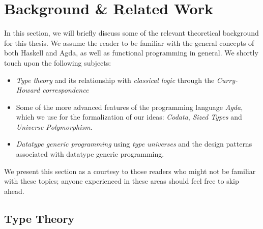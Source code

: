 \documentclass[a4paper,msc,twosized=semi]{uustthesis}
\begin{document}




\chapter{Background \& Related Work}
In this section, we will briefly discuss some of the relevant theoretical background 
for this thesis. We assume the reader to be familiar with the general concepts of both 
Haskell and Agda, as well as functional programming in general. We shortly touch upon 
the following subjects:

\begin{itemize}
  \item
  \emph{Type theory} and its relationship with \emph{classical logic} through the 
  \emph{Curry-Howard correspondence}

  \item 
  Some of the more advanced features of the programming language \emph{Agda}, which we 
  use for the formalization of our ideas: \emph{Codata}, \emph{Sized Types} and \emph
  {Universe Polymorphism}. 

  \item 
  \emph{Datatype generic programming} using \emph{type universes} and the design 
  patterns associated with datatype generic programming.  
\end{itemize}

  We present this section as a courtesy to those readers who might not be familiar 
  with these topics; anyone experienced in these areas should feel free to skip ahead. 

\section{Type Theory}
\end{document}
